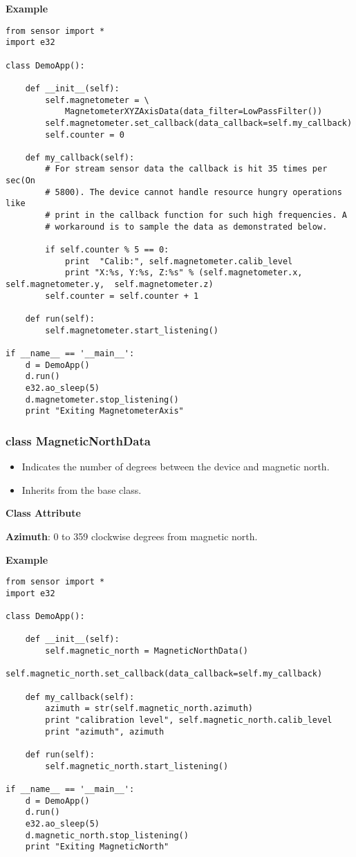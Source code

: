 {\bf Example} \break

\begin{verbatim}
from sensor import *
import e32

class DemoApp():

    def __init__(self):
        self.magnetometer = \
            MagnetometerXYZAxisData(data_filter=LowPassFilter())
        self.magnetometer.set_callback(data_callback=self.my_callback)
        self.counter = 0

    def my_callback(self):
        # For stream sensor data the callback is hit 35 times per sec(On
        # 5800). The device cannot handle resource hungry operations like
        # print in the callback function for such high frequencies. A
        # workaround is to sample the data as demonstrated below.

        if self.counter % 5 == 0:
            print  "Calib:", self.magnetometer.calib_level
            print "X:%s, Y:%s, Z:%s" % (self.magnetometer.x, self.magnetometer.y,  self.magnetometer.z)
        self.counter = self.counter + 1

    def run(self):
        self.magnetometer.start_listening()

if __name__ == '__main__':
    d = DemoApp()
    d.run()
    e32.ao_sleep(5)
    d.magnetometer.stop_listening()
    print "Exiting MagnetometerAxis"
\end{verbatim}

\subsubsection{class MagneticNorthData}

\begin{itemize}
\item Indicates the number of degrees between the device and magnetic north.
\item Inherits from the \class{_Sensor} base class.
\end{itemize}

{\bf Class Attribute} \break

{\bf Azimuth}: 0 to 359 clockwise degrees from magnetic north.

{\bf Example} \break

\begin{verbatim}
from sensor import *
import e32

class DemoApp():

    def __init__(self):
        self.magnetic_north = MagneticNorthData()
        self.magnetic_north.set_callback(data_callback=self.my_callback)

    def my_callback(self):
        azimuth = str(self.magnetic_north.azimuth)
        print "calibration level", self.magnetic_north.calib_level
        print "azimuth", azimuth

    def run(self):
        self.magnetic_north.start_listening()

if __name__ == '__main__':
    d = DemoApp()
    d.run()
    e32.ao_sleep(5)
    d.magnetic_north.stop_listening()
    print "Exiting MagneticNorth"
\end{verbatim}


